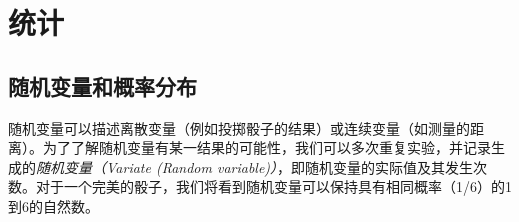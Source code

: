 
\chapter{统计}
\label{chap:statistics}
\section {随机变量和概率分布} 
\label{sec:pdfs}
随机变量可以描述离散变量（例如投掷骰子的结果）或连续变量（如测量的距离）。为了了解随机变量有某一结果的可能性，我们可以多次重复实验，并记录生成的\emph{随机变量（Variate (Random variable)）}，即随机变量的实际值及其发生次数。对于一个完美的骰子，我们将看到随机变量可以保持具有相同概率（1/6）的1到6的自然数。


